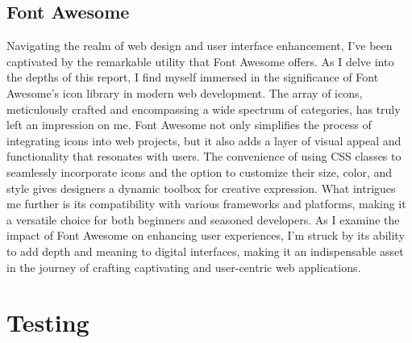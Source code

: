 \subsection{Font Awesome }
Navigating the realm of web design and user interface enhancement, I've been captivated by the remarkable utility that Font Awesome offers. As I delve into the depths of this report, I find myself immersed in the significance of Font Awesome's icon library in modern web development. The array of icons, meticulously crafted and encompassing a wide spectrum of categories, has truly left an impression on me. Font Awesome not only simplifies the process of integrating icons into web projects, but it also adds a layer of visual appeal and functionality that resonates with users. The convenience of using CSS classes to seamlessly incorporate icons and the option to customize their size, color, and style gives designers a dynamic toolbox for creative expression. What intrigues me further is its compatibility with various frameworks and platforms, making it a versatile choice for both beginners and seasoned developers. As I examine the impact of Font Awesome on enhancing user experiences, I'm struck by its ability to add depth and meaning to digital interfaces, making it an indispensable asset in the journey of crafting captivating and user-centric web applications.
\section{Testing}
